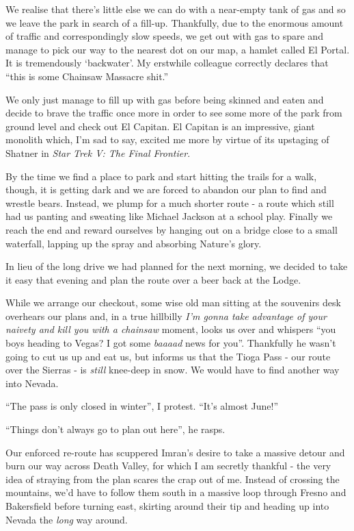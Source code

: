 \documentclass[a5paper,titlepage,11pt]{book}
\begin{document}
We realise that there's little else we can do with a near-empty tank of gas and so we leave the park in search of a fill-up. Thankfully, due to the enormous amount of traffic and correspondingly slow speeds, we get out with gas to spare and manage to pick our way to the nearest dot on our map, a hamlet called El Portal. It is tremendously `backwater'. My erstwhile colleague correctly declares that ``this is some Chainsaw Massacre shit.''

We only just manage to fill up with gas before being skinned and eaten and decide to brave the traffic once more in order to see some more of the park from ground level and check out El Capitan. El Capitan is an impressive, giant monolith which, I'm sad to say, excited me more by virtue of its upstaging of Shatner in \emph{Star Trek V: The Final Frontier}.

By the time we find a place to park and start hitting the trails for a walk, though, it is getting dark and we are forced to abandon our plan to find and wrestle bears. Instead, we plump for a much shorter route - a route which still had us panting and sweating like Michael Jackson at a school play. Finally we reach the end and reward ourselves by hanging out on a bridge close to a small waterfall, lapping up the spray and absorbing Nature's glory.

In lieu of the long drive we had planned for the next morning, we decided to take it easy that evening and plan the route over a beer back at the Lodge.

While we arrange our checkout, some wise old man sitting at the souvenirs desk overhears our plans and, in a true hillbilly \emph{I'm gonna take advantage of your naivety and kill you with a chainsaw} moment, looks us over and whispers ``you boys heading to Vegas? I got some \emph{baaaad} news for you''. Thankfully he wasn't going to cut us up and eat us, but informs us that the Tioga Pass - our route over the Sierras - is \emph{still} knee-deep in snow. We would have to find another way into Nevada.

``The pass is only closed in winter'', I protest. ``It's almost June!''

``Things don't always go to plan out here'', he rasps.

Our enforced re-route has scuppered Imran's desire to take a massive detour and burn our way across Death Valley, for which I am secretly thankful - the very idea of straying from the plan scares the crap out of me. Instead of crossing the mountains, we'd have to follow them south in a massive loop through Fresno and Bakersfield before turning east, skirting around their tip and heading up into Nevada the \emph{long} way around.
\end{document}
